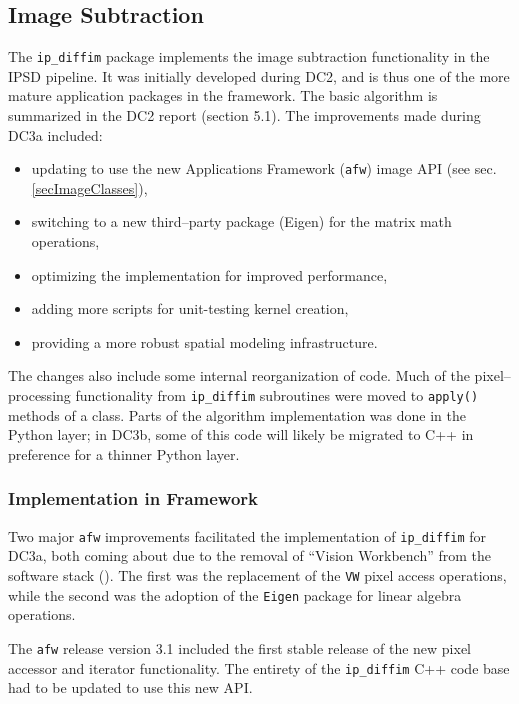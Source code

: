 
\subsection{Image Subtraction}

The {\tt ip\_diffim} package implements the image subtraction
functionality in the IPSD pipeline.  It was initially developed during
DC2, and is thus one of the more mature application packages in the
framework.  The basic algorithm is summarized in the DC2 report
(section 5.1).  The improvements made during DC3a included: 
\begin{itemize}
\item updating to use the new Applications Framework ({\tt afw}) image
  API (see sec. \ref{secImageClasses}),
\item switching to a new third--party package (Eigen) for the matrix
  math operations,
\item optimizing the implementation for improved performance,
\item adding more scripts for unit-testing kernel creation, 
\item providing a more robust spatial modeling infrastructure. 
\end{itemize}

The changes also include some internal reorganization of code.  Much
of the pixel--processing functionality from {\tt ip\_diffim}
subroutines were moved to {\tt apply()} methods of a class.  Parts of
the algorithm implementation was done in the Python layer; in DC3b,
some of this code will likely be migrated to C++ in preference for a
thinner Python layer. 

\subsubsection{Implementation in Framework}

Two major {\tt afw} improvements facilitated the implementation of
{\tt ip\_diffim} for DC3a, both coming about due to the removal of
``Vision Workbench'' from the software stack ().  The first was the
replacement of the {\tt VW} pixel access operations, while the second
was the adoption of the {\tt Eigen} package for linear algebra
operations.  

The {\tt afw} release version 3.1 included the first stable release of
the new pixel accessor and iterator functionality.  The entirety of
the {\tt ip\_diffim} C++ code base had to be updated to use this new
API.

